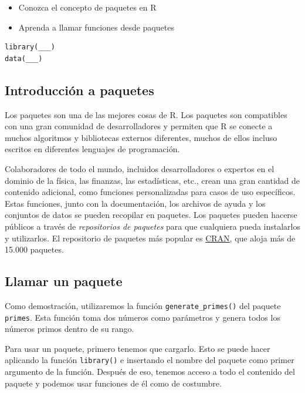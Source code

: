 \documentclass[
]{book}
\providecommand{\tightlist}{%
  \setlength{\itemsep}{0pt}\setlength{\parskip}{0pt}}
\begin{document}
\begin{itemize}
\tightlist
\item
  Conozca el concepto de paquetes en R
\item
  Aprenda a llamar funciones desde paquetes
\end{itemize}

\begin{verbatim}
library(___) 
data(___)
\end{verbatim}

\hypertarget{introducciuxf3n-a-paquetes}{%
\subsection{Introducción a paquetes}\label{introducciuxf3n-a-paquetes}}

Los paquetes son una de las mejores cosas de R. Los paquetes son compatibles con una gran comunidad de desarrolladores y permiten que R se conecte a muchos algoritmos y bibliotecas externos diferentes, muchos de ellos incluso escritos en diferentes lenguajes de programación.

Colaboradores de todo el mundo, incluidos desarrolladores o expertos en el dominio de la física, las finanzas, las estadísticas, etc., crean una gran cantidad de contenido adicional, como funciones personalizadas para casos de uso específicos. Estas funciones, junto con la documentación, los archivos de ayuda y los conjuntos de datos se pueden recopilar en paquetes. Los paquetes pueden hacerse públicos a través de \emph{repositorios de paquetes} para que cualquiera pueda instalarlos y utilizarlos. El repositorio de paquetes más popular es \href{https://cran.r-project.org/}{CRAN}, que aloja más de 15.000 paquetes.

\hypertarget{llamar-un-paquete}{%
\subsection{Llamar un paquete}\label{llamar-un-paquete}}

Como demostración, utilizaremos la función \texttt{generate\_primes()} del paquete \texttt{primes}. Esta función toma dos números como parámetros y genera todos los números primos dentro de su rango.

Para usar un paquete, primero tenemos que cargarlo. Esto se puede hacer aplicando la función \texttt{library()} e insertando el nombre del paquete como primer argumento de la función. Después de eso, tenemos acceso a todo el contenido del paquete y podemos usar funciones de él como de costumbre.
\end{document}
